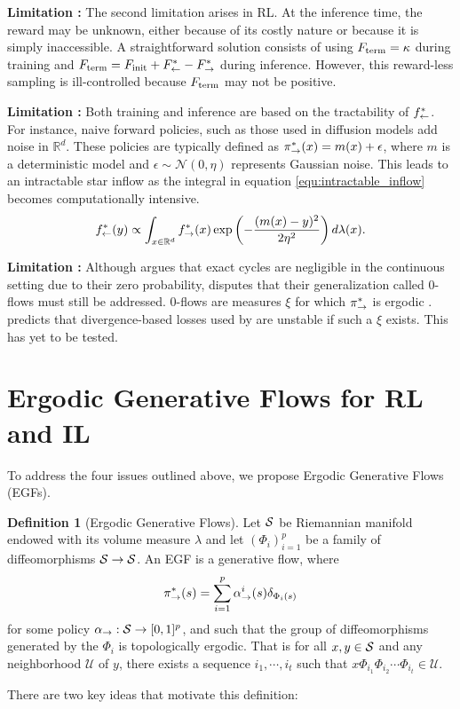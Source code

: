 \documentclass{article}
\theoremstyle{plain}
\theoremstyle{definition}
\newtheorem{definition}[theorem]{Definition}
\theoremstyle{remark}
\theoremstyle{fact}
\begin{document}
    \textbf{Limitation :} The second limitation arises in RL. At the inference time, the reward may be unknown, either because of its costly nature or because it is simply inaccessible. A straightforward solution consists of using $F_{\mathrm{term}} = \kappa$ during training and $F_{\mathrm{term}}= F_{\mathrm{init}} + F^*_{\leftarrow} - F^*_{\rightarrow}$ during inference. However, this reward-less sampling is ill-controlled because $F_{\mathrm{term}}$ may not be positive.

    \textbf{Limitation :} Both training and inference are based on the tractability of $f^*_{\leftarrow}$. For instance, naive forward policies, such as those used in diffusion models add noise in $\mathbb{R}^d$. These policies are typically defined as $\pi_{\rightarrow}^*(x) = m(x) + \epsilon$, where $m$ is a deterministic model and $\epsilon \sim \mathcal{N}(0, \eta)$ represents Gaussian noise. This leads to an intractable star inflow as the integral in equation \eqref{equ:intractable_inflow} becomes computationally intensive.
    \begin{equation}
        \label{equ:intractable_inflow}
         f^*_{\leftarrow}(y)  \propto \int_{x\in \mathbb R^d} f^*_{\rightarrow}(x) \exp\left(-\frac{(m(x)-y)^2}{2\eta^2}\right)d\lambda(x).
    \end{equation}

    \textbf{Limitation :} Although \citet{li2023cflownets} argues that exact cycles are negligible in the continuous setting due to their zero probability, \citet{brunswic2024theory} disputes that their generalization called 0-flows must still be addressed. 0-flows are measures $\xi$ for which $\pi_{\rightarrow}^*$ is ergodic \cite{walters2000introduction}. \citet{brunswic2024theory} predicts that divergence-based losses used by \citet{bengio2023gflownet} are unstable if such a $\xi$ exists. This has yet to be tested.
        
\section{Ergodic Generative Flows for  RL and IL} \label{sec:fundamentals_EGF}
    To address the four issues outlined above, we propose Ergodic Generative Flows (EGFs).
   
    \begin{definition}[Ergodic Generative Flows] 
        Let $\mathcal S$ be Riemannian manifold endowed with its volume measure $\lambda$ and let $(\Phi_{i})_{i=1}^p$ be a family of diffeomorphisms $\mathcal S\rightarrow \mathcal S$. An EGF is a generative flow, where  
        \begin{eqnarray} \label{equ:forward_policy}
            \pi_{\rightarrow}^*(s) = \sum_{i=1}^p\alpha_{\rightarrow}^i(s) \delta_{\Phi_i(s)}
        \end{eqnarray}    
        for some policy $\alpha_{\rightarrow}:\mathcal S \rightarrow [0,1]^p$, and such that the group of diffeomorphisms generated by the $\Phi_i$ is topologically ergodic. That is for all $x,y \in \mathcal S$ and any neighborhood $\mathcal U$ of $y$, there exists a sequence $i_1,\cdots, i_t$ such that $x\Phi_{i_1}\Phi_{i_2}\cdots \Phi_{i_t} \in \mathcal U$.
    \end{definition}
    There are two key ideas that motivate this definition:
\end{document}
